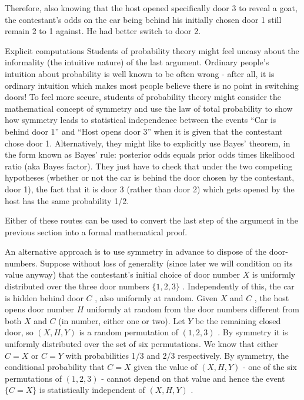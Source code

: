 Therefore, also knowing that the host opened specifically door 3 to reveal a goat, the contestant's odds on the car being behind his initially chosen door 1 still remain 2 to 1 against. He had better switch to door 2.

Explicit computations
Students of probability theory might feel uneasy about the informality (the intuitive nature) of the last argument. Ordinary people's intuition about probability is well known to be often wrong - after all, it is ordinary intuition which makes most people believe there is no point in switching doors! To feel more secure, students of probability theory might consider the mathematical concept of symmetry and use the law of total probability to show how symmetry leads to statistical independence between the events ``Car is behind door 1'' and ``Host opens door 3'' when it is given that the contestant chose door 1. Alternatively, they might like to explicitly use Bayes' theorem, in the form known as Bayes' rule: posterior odds equals prior odds times likelihood ratio (aka Bayes factor). They just have to check that under the two competing hypotheses (whether or not the car is behind the door chosen by the contestant, door 1), the fact that it is door 3 (rather than door 2) which gets opened by the host has the same probability 1/2.

Either of these routes can be used to convert the last step of the argument in the previous section into a formal mathematical proof.

An alternative approach is to use symmetry in advance to dispose of the door-numbers. Suppose without loss of generality (since later we will condition on its value anyway) that the contestant's initial choice of door number $ X$ is uniformly distributed over the three door numbers $ \{1,2,3\}$ . Independently of this, the car is hidden behind door $ C$ , also uniformly at random. Given $ X$ and $ C$ , the host opens door number $ H$ uniformly at random from the door numbers different from both $ X$ and $ C$ (in number, either one or two). Let $ Y$ be the remaining closed door, so $ (X,H,Y)$ is a random permutation of $ (1,2,3)$ . By symmetry it is uniformly distributed over the set of six permutations. We know that either $ C=X$ or $ C=Y$ with probabilities 1/3 and 2/3 respectively. By symmetry, the conditional probability that $ C=X$ given the value of $ (X,H,Y)$ - one of the six permutations of $ (1,2,3)$ - cannot depend on that value and hence the event $ \{C=X\}$ is statistically independent of $ (X,H,Y)$ .

